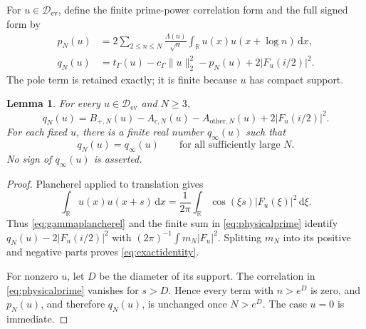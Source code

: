 \documentclass[11pt]{article}
\newtheorem{lemma}[theorem]{Lemma}
\theoremstyle{remark}
\newcommand{\R}{\mathbb R}
\newcommand{\dd}{\,\mathrm d}
\newcommand{\norm}[1]{\lVert #1\rVert}
\newcommand{\core}{\mathcal D_{\mathrm{ev}}}
\numberwithin{equation}{section}
\begin{document}
For $u\in\core$, define the finite prime-power correlation form and the full signed form by
\begin{align}
 p_N(u)&=2\sum_{2\le n\le N}\frac{\Lambda(n)}{\sqrt n}
       \int_\R u(x)u(x+\log n)\dd x,\label{eq:physicalprime}\\
 q_N(u)&=t_\Gamma(u)-c_\Gamma\norm{u}_2^2-p_N(u)
                       +2|F_u(i/2)|^2.\label{eq:fullform}
\end{align}
The pole term is retained exactly; it is finite because $u$ has compact support.

\begin{lemma}\label{lem:identity}
For every $u\in\core$ and $N\ge3$,
\begin{equation}\label{eq:exactidentity}
 q_N(u)=B_{+,N}(u)-A_{c,N}(u)-A_{\mathrm{other},N}(u)
                            +2|F_u(i/2)|^2.
\end{equation}
For each fixed $u$, there is a finite real number $q_\infty(u)$ such that
\begin{equation}\label{eq:stabilization}
 q_N(u)=q_\infty(u)\qquad\text{for all sufficiently large }N.
\end{equation}
No sign of $q_\infty(u)$ is asserted.
\end{lemma}
\begin{proof}
Plancherel applied to translation gives
\[
 \int_\R u(x)u(x+s)\dd x
  =\frac1{2\pi}\int_\R\cos(\xi s)|F_u(\xi)|^2\dd\xi.
\]
Thus \eqref{eq:gammaplancherel} and the finite sum in \eqref{eq:physicalprime} identify $q_N(u)-2|F_u(i/2)|^2$ with
$(2\pi)^{-1}\int m_N|F_u|^2$. Splitting $m_N$ into its positive and negative parts proves \eqref{eq:exactidentity}.

For nonzero $u$, let $D$ be the diameter of its support. The correlation in \eqref{eq:physicalprime} vanishes for $s>D$. Hence every term with $n>e^D$ is zero, and $p_N(u)$, and therefore $q_N(u)$, is unchanged once $N>e^D$. The case $u=0$ is immediate.
\end{proof}
\end{document}

